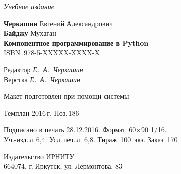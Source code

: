 \documentclass[a4paper,openany,twoside,final]{book}
\providecommand{\DUadmonition}[2][class-arg]{%
  \ifcsname DUadmonition#1\endcsname%
    \csname DUadmonition#1\endcsname{#2}%
  \else
    \begin{center}
      \fbox{\parbox{0.9\textwidth}{#2}}
    \end{center}
  \fi
}
\providecommand*{\DUtitle}[2][class-arg]{%
  \ifcsname DUtitle#1\endcsname%
    \csname DUtitle#1\endcsname{#2}%
  \else
    \smallskip\noindent\textbf{#2}\smallskip%
  \fi
}
\begin{document}






\newpage
\thispagestyle{empty}
\mbox{}

\vfill\vfill\vfill\vfill

\hfill{}{\small\itshape Учебное издание}
\vspace{4ex}
\begin{center}
{\small\textbf{Черкашин} Евгений Александрович\\}
{\small\textbf{Байджу} Мухаган \\[1em]}
{\bfseries Компонентное программирование в Python}\\[1em]
ISBN~978-5-XXXXX-XXXX-X
\vfill

\small
Редактор \textit{Е.~А.~Черкашин}\\
Верстка \textit{Е.~А.~Черкашин}

\vfill{}
{\small Макет подготовлен при помощи системы \LaTeXsys\\\mbox{}}
\vfill{}

Темплан 2016\,{}г. Поз.\,{}186

\end{center}
\begin{center}\small
\noindent Подписано в печать 28.12.2016.
Формат~60$\times$90 1/16.\\  %
Уч.-изд.\,{}л.\,{}6,4. Усл.\,{}печ.\,{}л. 6,8. Тираж~100~экз. Заказ~170
\end{center}
\vspace{1           ex}
\begin{center}\small
Издательство ИРНИТУ\\{}
664074, г.\,{}Иркутск, ул. Лермонтова, 83 \label{lastpage}
\end{center}
\end{document}
